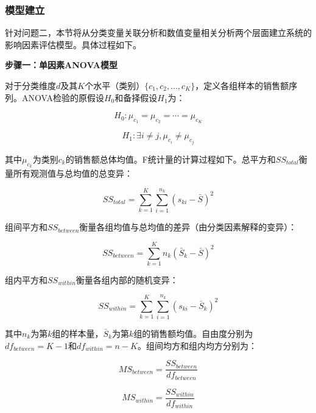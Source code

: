 

\subsubsection{模型建立}

针对问题二，本节将从分类变量关联分析和数值变量相关分析两个层面建立系统的影响因素评估模型。具体过程如下。

\textbf{步骤一：单因素ANOVA模型}

对于分类维度$d$及其$K$个水平（类别）$\{c_1, c_2, \ldots, c_K\}$，定义各组样本的销售额序列。ANOVA检验的原假设$H_0$和备择假设$H_1$为：

\begin{equation}
H_0: \mu_{c_1} = \mu_{c_2} = \cdots = \mu_{c_K}
\end{equation}

\begin{equation}
H_1: \exists i \neq j, \mu_{c_i} \neq \mu_{c_j}
\end{equation}

其中$\mu_{c_k}$为类别$c_k$的销售额总体均值。F统计量的计算过程如下。总平方和$SS_{total}$衡量所有观测值与总均值的总变异：

\begin{equation}
SS_{total} = \sum_{k=1}^{K} \sum_{i=1}^{n_k} (s_{ki} - \bar{S})^2
\end{equation}

组间平方和$SS_{between}$衡量各组均值与总均值的差异（由分类因素解释的变异）：

\begin{equation}
SS_{between} = \sum_{k=1}^{K} n_k (\bar{S}_k - \bar{S})^2
\end{equation}

组内平方和$SS_{within}$衡量各组内部的随机变异：

\begin{equation}
SS_{within} = \sum_{k=1}^{K} \sum_{i=1}^{n_k} (s_{ki} - \bar{S}_k)^2
\end{equation}

其中$n_k$为第$k$组的样本量，$\bar{S}_k$为第$k$组的销售额均值。自由度分别为$df_{between}=K-1$和$df_{within}=n-K$。组间均方和组内均方分别为：

\begin{equation}
MS_{between} = \frac{SS_{between}}{df_{between}}
\end{equation}

\begin{equation}
MS_{within} = \frac{SS_{within}}{df_{within}}
\end{equation}

